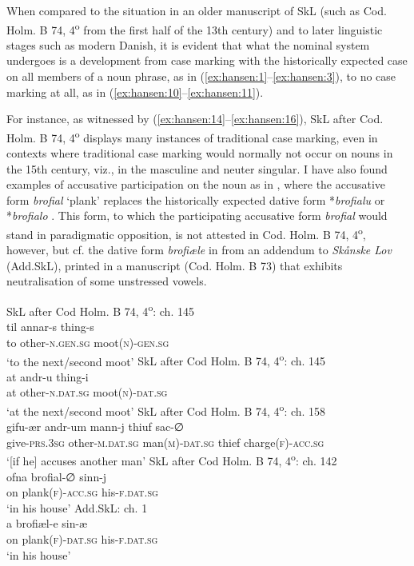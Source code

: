 \documentclass[output=paper]{langsci/langscibook}
\begin{document}
When compared to the situation in an older manuscript of SkL (such as Cod. Holm. B 74, 4\textsuperscript{o} from the first half of the 13th century) and to later linguistic stages such as modern Danish, it is evident that what the nominal system undergoes is a development from case marking with the historically expected case on all members of a noun phrase, as in (\ref{ex:hansen:1}--\ref{ex:hansen:3}), to no case marking at all, as in (\ref{ex:hansen:10}--\ref{ex:hansen:11}).

For instance, as witnessed by (\ref{ex:hansen:14}--\ref{ex:hansen:16}), SkL after Cod. Holm. B 74, 4\textsuperscript{o} displays many instances of traditional case marking, even in contexts where traditional case marking would normally not occur on nouns in the 15th century, viz., in the masculine and neuter singular. I have also found examples of accusative participation on the noun as in , where the accusative form \textit{brofial} ‘plank’ replaces the historically expected dative form *\textit{brofialu} or *\textit{brofialo} \citep[39]{Bjerrum1966}. This form, to which the participating accusative form \textit{brofial} would stand in paradigmatic opposition, is not attested in Cod. Holm. B 74, 4\textsuperscript{o}, however, but cf. the dative form \textit{brofiæle} in  from an addendum to \textit{Skånske Lov} (Add.SkL), printed in a manuscript (Cod. Holm. B 73) that exhibits neutralisation of some unstressed vowels.

\ea \label{ex:hansen:14}
{SkL after Cod Holm. B 74, 4\textsuperscript{o}: ch. 145} \\ 
\gll til annar-s thing-s\\
     to other-\textsc{n.gen.sg} moot\textsc{(n)-gen.sg}\\
\glt ‘to the next/second moot’
\ex \label{ex:hansen:15}
{SkL after Cod Holm. B 74, 4\textsuperscript{o}: ch. 145} \\ 
\gll at andr-u thing-i\\
     at other-\textsc{n.dat.sg} moot\textsc{(n)-dat.sg}\\
\glt ‘at the next/second moot’
\ex \label{ex:hansen:16}
{SkL after Cod Holm. B 74, 4\textsuperscript{o}: ch. 158} \\
\gll gifu-ær andr-um mann-j thiuf sac-∅\\
     give-\textsc{prs.3sg} other-\textsc{m.dat.sg} man\textsc{(m)-dat.sg} thief charge\textsc{(f)-acc.sg}\\
\glt ‘[if he] accuses another man’
\ex \label{ex:hansen:17}
{SkL after Cod Holm. B 74, 4\textsuperscript{o}: ch. 142} \\
\gll ofna brofial-∅ sinn-j\\
     on plank\textsc{(f)-acc.sg} his\textsc{{}-f.dat.sg}\\
\glt ‘in his house’
\ex \label{ex:hansen:18}
{Add.SkL: ch. 1}\\
\gll a brofiæl-e sin-æ\\
     on plank\textsc{(f)-dat.sg} his\textsc{{}-f.dat.sg}\\
\glt ‘in his house’
\z
\end{document}
